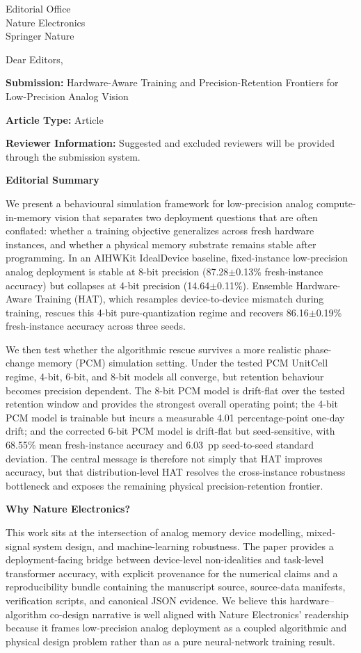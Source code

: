 \documentclass[11pt,a4paper]{letter}
\begin{document}
\begin{letter}{Editorial Office\\Nature Electronics\\Springer Nature}

\opening{Dear Editors,}

\textbf{Submission:} Hardware-Aware Training and Precision-Retention Frontiers for Low-Precision Analog Vision

\textbf{Article Type:} Article

\textbf{Reviewer Information:} Suggested and excluded reviewers will be provided through the submission system.

\vspace{0.5em}
\textbf{Editorial Summary}

We present a behavioural simulation framework for low-precision analog compute-in-memory vision that separates two deployment questions that are often conflated: whether a training objective generalizes across fresh hardware instances, and whether a physical memory substrate remains stable after programming. In an AIHWKit IdealDevice baseline, fixed-instance low-precision analog deployment is stable at 8-bit precision (87.28$\pm$0.13\% fresh-instance accuracy) but collapses at 4-bit precision (14.64$\pm$0.11\%). Ensemble Hardware-Aware Training (HAT), which resamples device-to-device mismatch during training, rescues this 4-bit pure-quantization regime and recovers 86.16$\pm$0.19\% fresh-instance accuracy across three seeds.

We then test whether the algorithmic rescue survives a more realistic phase-change memory (PCM) simulation setting. Under the tested PCM UnitCell regime, 4-bit, 6-bit, and 8-bit models all converge, but retention behaviour becomes precision dependent. The 8-bit PCM model is drift-flat over the tested retention window and provides the strongest overall operating point; the 4-bit PCM model is trainable but incurs a measurable 4.01 percentage-point one-day drift; and the corrected 6-bit PCM model is drift-flat but seed-sensitive, with 68.55\% mean fresh-instance accuracy and 6.03~pp seed-to-seed standard deviation. The central message is therefore not simply that HAT improves accuracy, but that distribution-level HAT resolves the cross-instance robustness bottleneck and exposes the remaining physical precision-retention frontier.

\vspace{0.5em}
\textbf{Why Nature Electronics?}

This work sits at the intersection of analog memory device modelling, mixed-signal system design, and machine-learning robustness. The paper provides a deployment-facing bridge between device-level non-idealities and task-level transformer accuracy, with explicit provenance for the numerical claims and a reproducibility bundle containing the manuscript source, source-data manifests, verification scripts, and canonical JSON evidence. We believe this hardware--algorithm co-design narrative is well aligned with Nature Electronics' readership because it frames low-precision analog deployment as a coupled algorithmic and physical design problem rather than as a pure neural-network training result.


\end{letter}
\end{document}
